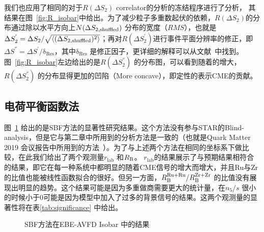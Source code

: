 我们也应用了相同的对于$R(\Delta S_2)$ correlator的分析的冻结程序进行了分析， 其结果在图~\ref{fig:R_isobar}中给出。为了减少粒子多重数起伏的依赖，$R(\Delta S_2)$的分布通过除以水平方向上$N(\Delta S_{2,\rm shuffled})$ 分布的宽度（$RMS$），也就是$\Delta S_2^{'} = \Delta S_2/\sqrt{\langle(\Delta S_{2,\rm shuffled})^2\rangle}$；再对$R(\Delta S_2^{'})$进行事件平面分辨率的修正，即$\Delta S^{''}= \Delta S^{'}/\mathrm{\delta_{Res}}$，其中$\mathrm{\delta_{Res}}$ 是修正因子，更详细的解释可以从文献~\cite{RCorr-2018}中找到。图~\ref{fig:R_isobar}左边给出的是$R(\Delta S_2^{''})$ 的分布图，可以看到随着\ns 的增大，$R(\Delta S_2^{''})$ 的分布显得更加的凹陷（More concave），即定性的表示CME的贡献。


\subsection{电荷平衡函数法}

图~\ref{fig:SBF_isobar}  给出的是SBF方法的显著性研究结果。这个方法没有参与STAR的Blind-analysis，但是它与第二章中所用到的分析方法是一致的（也就是Quark Matter 2019 会议报告中所用到的方法~\cite{Lin2021}）。为了与上述两个方法在相同的坐标系下做比较，在此我们给出了两个观测量$r_\mathrm{lab}$ 和$R_{\rm B}$。
$r_\mathrm{lab}$的结果展示了与预期结果相符合的结果，即它在每一种系统中都明显的随着CME信号的增大而增大，并且Ru与Zr的比值也能被线性函数拟合的很好。但另一方面，$R_{\rm B}^{\rm Ru+Ru}/R_{\rm B}^{\rm Zr+Zr}$ 的比值没有展现出明显的趋势。这个结果可能是因为多重做商需要更大的统计量，在$n_5/s$ 很小的时候\rb 小于0可能是因为模型中加入了过多的背景信号的结果。这两个观测量的显著性将在表\ref{tab:significance} 中给出。

\begin{figure}
\hspace{-1.2cm}
\centering
{}
\caption{ SBF方法在EBE-AVFD Isobar 中的结果
}
\hspace{1.43cm}\label{fig:SBF_isobar}
\end{figure}


